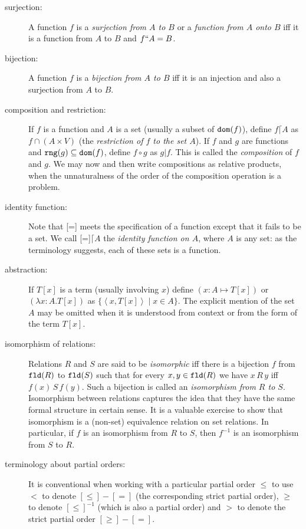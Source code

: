 \documentclass[12pt]{book}
\begin{document}
\begin{description}
\item[surjection:] A function $f$ is a {\em surjection from $A$ to
$B$\/} or a {\em function from $A$ onto $B$\/} iff it is a function
from $A$ to $B$ and $f``A=B$.

\item[bijection:] A function $f$ is a {\em bijection from $A$ to $B$\/} iff it
is an injection and also a surjection from $A$ to $B$.

\item[composition and restriction:] If $f$ is a function and $A$ is a
set (usually a subset of ${\tt dom}(f)$), define $f\lceil A$ as $f
\cap (A \times V)$ (the {\em restriction of $f$ to the set $A$\/}).
If $f$ and $g$ are functions and ${\tt rng}(g) \subseteq {\tt
dom}(f)$, define $f \circ g$ as $g|f$.  This is called the {\em
composition\/} of $f$ and $g$.  We may now and then write compositions as relative products, when the unnaturalness of the order of the composition operation is a problem.

\item[identity function:] Note that [=] meets the specification of a function except that it fails to be a set.  We call [=]$\lceil A$ the {\em identity
function on $A$\/}, where $A$ is any set:  as the terminology suggests, each of these sets is a function.

\item[abstraction:] If $T[x]$ is a term (usually involving $x$) define
$(x:A \mapsto T[x])$ or $(\lambda x:A.T[x])$ as
$\{\left<x,T[x]\right>\mid x \in A\}$.  The explicit mention of
the set $A$ may be omitted when it is understood from context or 
from the form of the term $T[x]$.

\item[isomorphism of relations:]  Relations $R$ and $S$ are said to be {\em isomorphic\/} iff there is a bijection $f$ from ${\tt fld}(R)$ to ${\tt fld}(S)$ such that for every $x,y \in {\tt fld}(R)$ we have $x \, R \, y$ iff $f(x) \, S \, f(y)$.  Such a bijection is called an {\em isomorphism from $R$ to $S$\/}.  Isomorphism between relations captures the idea that they have the same formal structure in certain sense.  It is a valuable exercise to show that isomorphism is a (non-set) equivalence relation on set relations.  In particular, if $f$ is an isomorphism from $R$ to $S$, then $f^{-1}$ is an isomorphism from $S$ to $R$.
\item[terminology about partial orders:]

It is conventional when working with a particular partial order $\leq$
to use $<$ to denote $[\leq]-[=]$ (the corresponding strict partial
order), $\geq$ to denote $[\leq]^{-1}$ (which is also a partial order)
and $>$ to denote the strict partial order $[\geq]-[=]$.


\end{description}
\end{document}
